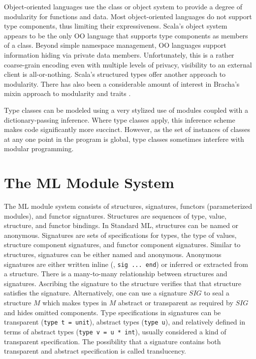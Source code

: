 \documentclass[12pt]{article}
\begin{document}
Object-oriented languages use the class or object system to provide a degree of modularity for functions and data. Most object-oriented languages do not support type components, thus limiting their expressiveness. Scala's object system\cite{odersky-et-al:ecoop03} appears to be the only OO language that supports type components as members of a class. Beyond simple namespace management, OO languages support information hiding via private data members. Unfortunately, this is a rather coarse-grain encoding even with multiple levels of privacy, visibility to an external client is all-or-nothing. Scala's structured types offer another approach to modularity. There has also been a considerable amount of interest in Bracha's mixin approach to modularity \cite{brachacook:mixin,bracha:thesis,duggan96} and traits \cite{Scharli03traits:composable,typed-traits-tr}. 

		Type classes\cite{wadlerblott} can be modeled using a very stylized use of modules coupled with a dictionary-passing inference\cite{dhck07}. Where type classes apply, this inference scheme makes code significantly more succinct. However, as the set of instances of classes at any one point in the program is global, type classes sometimes interfere with modular programming. 
		
\section{The ML Module System}
The ML module system consists of structures, signatures, functors (parameterized modules), and functor signatures. Structures are sequences of type, value, structure, and functor bindings. In Standard ML, structures can be named or anonymous. Signatures are sets of specifications for types, the type of values, structure component signatures, and functor component signatures. Similar to structures, signatures can be either named and anonymous. Anonymous signatures are either written inline (\ie, \lstinline{sig ... end}) or inferred or extracted from a structure. There is a many-to-many relationship between structures and signatures. Ascribing the signature to the structure verifies that that structure satisfies the signature. Alternatively, one can use a signature $SIG$ to seal a structure $M$ which makes types in $M$ abstract or transparent as required by $SIG$ and hides omitted components. Type specifications in signatures can be transparent (\lstinline{type t = unit}), abstract types (\lstinline{type u}), and relatively defined in terms of abstract types (\lstinline{type v = u * int}), usually considered a kind of transparent specification. The possibility that a signature contains both transparent and abstract specification is called translucency. 
\end{document}
